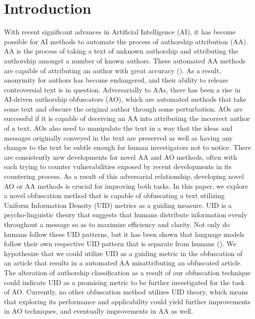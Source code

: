 \documentclass{article}
\begin{document}
\section{Introduction}
With recent significant advances in Artificial Intelligence (AI), it has become possible for AI methods to automate the process of authorship attribution (AA). AA is the process of taking a text of unknown authorship and attributing the authorship amongst a number of known authors. These automated AA methods are capable of attributing an author with great accuracy (\cite{Uchendu2020-nk}). As a result, anonymity for authors has become endangered, and their ability to release controversial text is in question. Adversarially to AAs, there has been a rise in AI-driven authorship obfuscators (AO), which are automated methods that take some text and obscure the original author through some perturbation. AOs are successful if it is capable of deceiving an AA into attributing the incorrect author of a text. AOs also need to manipulate the text in a way that the ideas and messages originally conveyed in the text are preserved as well as having any changes to the text be subtle enough for human investigators not to notice.
There are consistently new developments for novel AA and AO methods, often with each trying to counter vulnerabilities exposed by recent developments in its countering process. As a result of this adversarial relationship, developing novel AO or AA methods is crucial for improving both tasks. In this paper, we explore a novel obfuscation method that is capable of obfuscating a text utilizing Uniform Information Density (UID) metrics as a guiding measure. UID is a psycho-linguistic theory that suggests that humans distribute information evenly throughout a message so as to maximize efficiency and clarity. Not only do humans follow these UID patterns, but it has been shown that language models follow their own respective UID pattern that is separate from humans (\cite{Venkatraman2023-bx}). We hypothesize that we could utilize UID as a guiding metric in the obfuscation of an article that results in a automated AA misattributing an obfuscated article. The alteration of authorship classification as a result of our obfuscation technique could indicate UID as a promising metric to be further investigated for the task of AO. Currently, no other obfuscation method utilizes UID theory, which means that exploring its performance and applicability could yield further improvements in AO techniques, and eventually improvements in AA as well.
\end{document}
